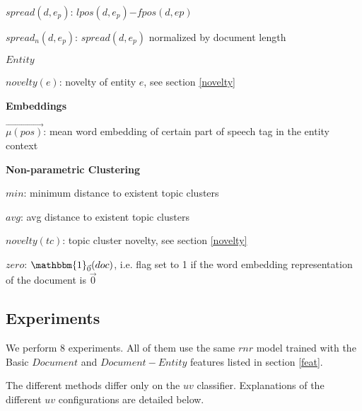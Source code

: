 \documentclass{article}
\begin{document}
\begin{itemize*}
\begin{itemize*}
\begin{itemize*}
            \item $spread(d,e_p)$: $lpos(d,e_p)\mathord{-}fpos(d,ep)$
            \item $spread_n(d,e_p)$: $spread(d,e_p)$ normalized by document length
        \end{itemize*}
      \item $Entity$
        \begin{itemize*}
            \item $novelty(e)$: novelty of entity $e$, see section \ref{novelty}
        \end{itemize*}              
    \end{itemize*}
  \item \textbf{Embeddings}
    \begin{itemize*}
        \item $\vec{\mu(pos)}$: mean word embedding of certain part of speech tag in the entity context
    \end{itemize*}
  \item \textbf{Non-parametric Clustering}
    \begin{itemize*}
        \item $min$: minimum distance to existent topic clusters
        \item $avg$: avg distance to existent topic clusters
        \item $novelty(tc)$: topic cluster novelty, see section \ref{novelty}
        \item $zero$: $\mathbbm{1}_{\vec{0}}{(doc)}$, i.e. flag set to 1 if the word embedding representation of the document is $\vec{0}$
    \end{itemize*}
\end{itemize*}


\subsection{Experiments}

We perform 8 experiments. All of them use the same $rnr$ model trained with the Basic $Document$ and $Document-Entity$ features listed in section \ref{feat}.

The different methods differ only on the $uv$ classifier. Explanations of the different $uv$ configurations are detailed below.
\end{document}

